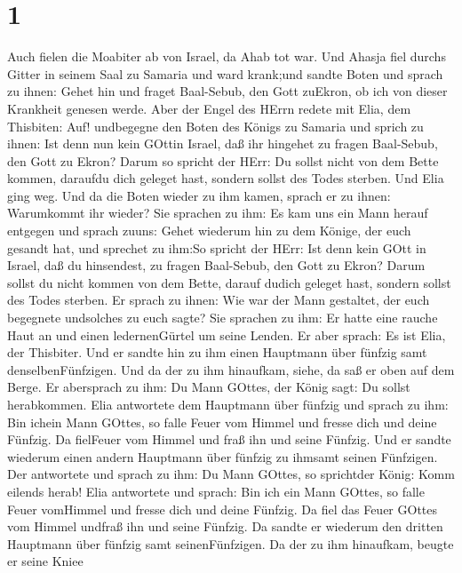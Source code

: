 \hypertarget{section}{%
\section{1}\label{section}}

 Auch fielen die Moabiter ab von Israel, da Ahab tot war.
 Und Ahasja fiel durchs Gitter in seinem Saal zu Samaria und
ward krank;und sandte Boten und sprach zu ihnen: Gehet hin und fraget
Baal-Sebub, den Gott zuEkron, ob ich von dieser Krankheit genesen werde.
 Aber der Engel des HErrn redete mit Elia, dem Thisbiten:
Auf! undbegegne den Boten des Königs zu Samaria und sprich zu ihnen: Ist
denn nun kein GOttin Israel, daß ihr hingehet zu fragen Baal-Sebub, den
Gott zu Ekron?  Darum so spricht der HErr: Du sollst nicht
von dem Bette kommen, daraufdu dich geleget hast, sondern sollst des
Todes sterben. Und Elia ging weg.  Und da die Boten wieder
zu ihm kamen, sprach er zu ihnen: Warumkommt ihr wieder? 
Sie sprachen zu ihm: Es kam uns ein Mann herauf entgegen und sprach
zuuns: Gehet wiederum hin zu dem Könige, der euch gesandt hat, und
sprechet zu ihm:So spricht der HErr: Ist denn kein GOtt in Israel, daß
du hinsendest, zu fragen Baal-Sebub, den Gott zu Ekron? Darum sollst du
nicht kommen von dem Bette, darauf dudich geleget hast, sondern sollst
des Todes sterben.  Er sprach zu ihnen: Wie war der Mann
gestaltet, der euch begegnete undsolches zu euch sagte?  Sie
sprachen zu ihm: Er hatte eine rauche Haut an und einen ledernenGürtel
um seine Lenden. Er aber sprach: Es ist Elia, der Thisbiter.
 Und er sandte hin zu ihm einen Hauptmann über fünfzig samt
denselbenFünfzigen. Und da der zu ihm hinaufkam, siehe, da saß er oben
auf dem Berge. Er abersprach zu ihm: Du Mann GOttes, der König sagt: Du
sollst herabkommen.  Elia antwortete dem Hauptmann über
fünfzig und sprach zu ihm: Bin ichein Mann GOttes, so falle Feuer vom
Himmel und fresse dich und deine Fünfzig. Da fielFeuer vom Himmel und
fraß ihn und seine Fünfzig.  Und er sandte wiederum einen
andern Hauptmann über fünfzig zu ihmsamt seinen Fünfzigen. Der
antwortete und sprach zu ihm: Du Mann GOttes, so sprichtder König: Komm
eilends herab!  Elia antwortete und sprach: Bin ich ein
Mann GOttes, so falle Feuer vomHimmel und fresse dich und deine Fünfzig.
Da fiel das Feuer GOttes vom Himmel undfraß ihn und seine Fünfzig.
 Da sandte er wiederum den dritten Hauptmann über fünfzig
samt seinenFünfzigen. Da der zu ihm hinaufkam, beugte er seine Kniee
